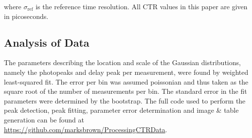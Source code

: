 where $\sigma_\text{ref}$ is the reference time resolution. All CTR values in this paper are given in picoseconds.

\subsection{Analysis of Data}
The parameters describing the location and scale of the Gaussian distributions, namely the photopeaks and delay peak per measurement, were found by weighted least-squared fit. The error per bin was assumed poissonian and thus taken as the square root of the number of measurements per bin. The standard error in the fit parameters were determined by the bootstrap\cite{degroot2012probability}. The full code used to perform the peak detection, peak fitting, parameter error determination and image \& table generation can be found at \href{https://github.com/marksbrown/ProcessingCTRData}{https://github.com/marksbrown/ProcessingCTRData}.